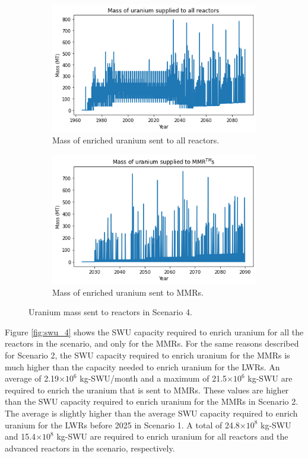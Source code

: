 \begin{figure}
    \centering
    \begin{subfigure}{0.5\textwidth}
        \centering
        \includegraphics[scale=0.5]{../figures/fuelsupply_scenarios_4.png}
        \caption{Mass of enriched uranium sent to all reactors.}
        \label{fig:totalfuel_4}
    \end{subfigure}
    \hspace{0.8cm}
    \begin{subfigure}{0.5\textwidth}
        \centering
        \includegraphics[scale=0.5]{../figures/advancedRX_fuelsupply_scenarios_4.png}
        \caption{Mass of enriched uranium sent to \glspl{MMR}.}
        \label{fig:haleu_4}
    \end{subfigure}
    \caption{Uranium mass sent to reactors in Scenario 4.}
    \label{fig:fuel_4}
\end{figure}

Figure \ref{fig:swu_4} shows the \gls{SWU} capacity required to 
enrich uranium for all the reactors in the scenario, and 
only for the \glspl{MMR}. For the same reasons described for 
Scenario 2, the \gls{SWU} capacity required to enrich uranium 
for the \glspl{MMR} is much higher than the capacity needed to 
enrich uranium for the \glspl{LWR}. An average of 2.19$\times 10^6$ 
kg-\gls{SWU}/month and a maximum of 21.5$\times 10^6$ kg-\gls{SWU}
are required to enrich the uranium that is sent to \glspl{MMR}. These values 
are higher than the \gls{SWU} 
capacity required to enrich uranium for the \glspl{MMR} in 
Scenario 2. The average is slightly higher than the average \gls{SWU} 
capacity required to enrich uranium for the \glspl{LWR} before 2025 in 
Scenario 1. A total of 24.8$\times 10^8$ kg-SWU and 15.4$\times 10^8$
kg-SWU are required to enrich uranium for all reactors and the advanced 
reactors in the scenario, respectively. 

